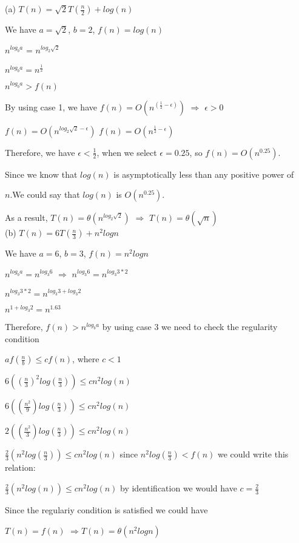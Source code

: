 \documentclass[12]{article}
\begin{document}
(a) $T(n) = \sqrt{2}T(\frac{n}{2}) + log(n)$

We have $a=\sqrt{2}$, $b = 2$, $f(n) = log(n)$ 

$n^{log_b{a}}$ = $n^{log_2{\sqrt{2}}}$

$n^{log_b{a}} = n^{\frac{1}{2}}$

$n^{log_b{a}} > f(n)$

By using case 1, we have $ f(n) = O( n^{(\frac{1}{2} - \epsilon)})$ $\Rightarrow$ $\epsilon > 0$
 
$f(n) = O(n^{log_2{\sqrt{2}} - \epsilon })$
$f(n) = O(n^{\frac{1}{2} - \epsilon})$ 

Therefore, we have $\epsilon < \frac{1}{2}$, when we select $\epsilon = 0.25$, so $f(n) = O ( n^{0.25} )$.

Since we  know that $log(n)$ is asymptotically less than any positive power of 

$n$.We could say that  $log(n)$ is $O(n^{0.25})$.

As a result, $T(n) = \theta(n^{log_2{\sqrt{2}}})$ $\Rightarrow$ $T(n) = \theta(\sqrt{n})$\\

(b) $T(n) = 6T(\frac{n}{3}) + n^2logn$

We have $a = 6 $, $ b = 3 $,  $f(n) = n^2logn $

$n^{log_b{a}} = n^{log_3{6}}$  $\Rightarrow$
$n^{log_3{6}} = n^{log_3{3 * 2}}$

$n^{log_3{3 * 2}} = n^{log_3{3} + log_3{2}}$

$n^{ 1 + log_3{2}} = n^{1.63}$

Therefore, $f(n) > n^{log_b{a}}$ by using case 3 we need to check the regularity condition

$af(\frac{n}{b}) \leqslant cf(n)$, where $c < 1 $

$6((\frac{n}{3})^2log(\frac{n}{3})) \leqslant cn^2log(n)$

$6((\frac{n^2}{9})log(\frac{n}{3})) \leqslant cn^2log(n)$

$2((\frac{n^2}{3})log(\frac{n}{3})) \leqslant cn^2log(n)$

$\frac{2}{3}(n^2log( \frac{n}{3})) \leqslant cn^2log(n)$ since $n^2log( \frac{n}{3}) < f(n) $  we could write this relation:

$\frac{2}{3}(n^2log(n)) \leqslant cn^2log(n)$ by identification we  would have $c = \frac{2}{3}$

Since the regulariy condition is satisfied we could have 

$T(n) = f(n)$ $\Rightarrow T(n) = \theta(n^2logn)$ \\
\end{document}
